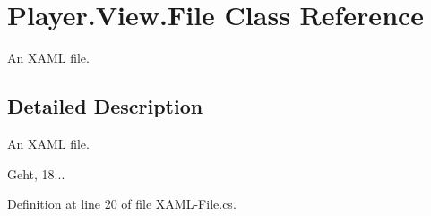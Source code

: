 \section{Player.\-View.\-File Class Reference}
\label{class_player_1_1_view_1_1_file}


An X\-A\-M\-L file.  




\subsection{Detailed Description}
An X\-A\-M\-L file. 

Geht, 18... 

Definition at line 20 of file X\-A\-M\-L-\/\-File.\-cs.

